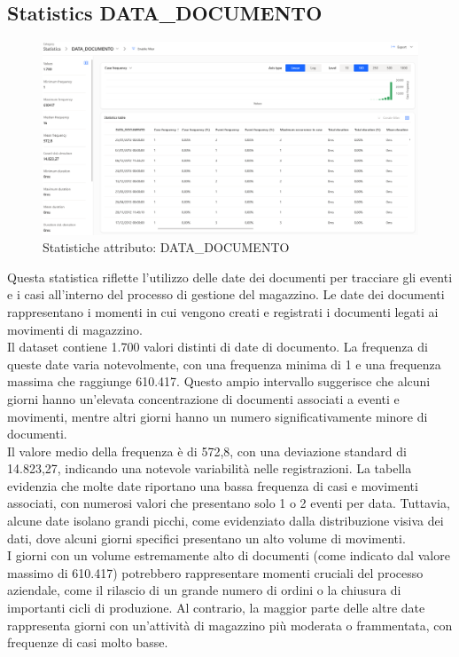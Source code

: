 \documentclass{article}
\begin{document}
\subsection{Statistics DATA\_DOCUMENTO}
\begin{figure}[H]
    \centering
    \includegraphics[width=\textwidth]{imgMicrosoft/DatiReali/StatisticsDATADOCUMENTODatiReali.png}
    \caption{Statistiche attributo: DATA\_DOCUMENTO}
    \label{fig:statistics-DATA-DOCUMENTO}
\end{figure}
Questa statistica riflette l'utilizzo delle date dei documenti per tracciare gli eventi e i casi all'interno del processo di gestione del magazzino. Le date dei documenti rappresentano i momenti in cui vengono creati e registrati i documenti legati ai movimenti di magazzino.\\
Il dataset contiene 1.700 valori distinti di date di documento. La frequenza di queste date varia notevolmente, con una frequenza minima di 1 e una frequenza massima che raggiunge 610.417. Questo ampio intervallo suggerisce che alcuni giorni hanno un'elevata concentrazione di documenti associati a eventi e movimenti, mentre altri giorni hanno un numero significativamente minore di documenti.\\
Il valore medio della frequenza è di 572,8, con una deviazione standard di 14.823,27, indicando una notevole variabilità nelle registrazioni. La tabella evidenzia che molte date riportano una bassa frequenza di casi e movimenti associati, con numerosi valori che presentano solo 1 o 2 eventi per data. Tuttavia, alcune date isolano grandi picchi, come evidenziato dalla distribuzione visiva dei dati, dove alcuni giorni specifici presentano un alto volume di movimenti.\\
I giorni con un volume estremamente alto di documenti (come indicato dal valore massimo di 610.417) potrebbero rappresentare momenti cruciali del processo aziendale, come il rilascio di un grande numero di ordini o la chiusura di importanti cicli di produzione. Al contrario, la maggior parte delle altre date rappresenta giorni con un'attività di magazzino più moderata o frammentata, con frequenze di casi molto basse.\\
\end{document}
